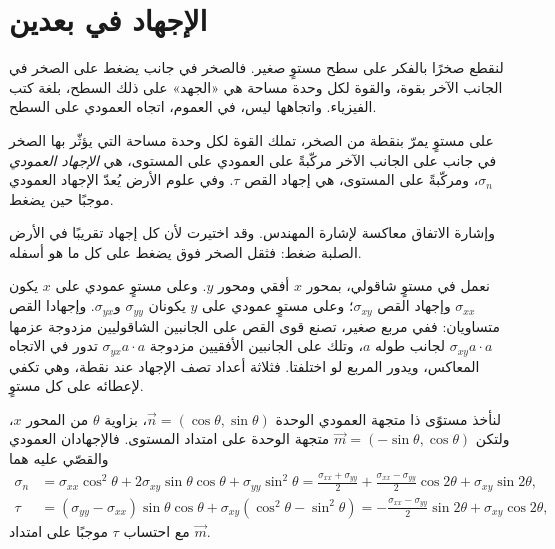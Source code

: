 \section{الإجهاد في بعدين}\label{sec:b1:stress-strain-rheology:stress}

لنقطع صخرًا بالفكر على سطح مستوٍ صغير. فالصخر في جانب يضغط على الصخر في الجانب الآخر بقوة، والقوة لكل وحدة مساحة هي «الجهد» على ذلك السطح، بلغة كتب الفيزياء. واتجاهها ليس، في العموم، اتجاه العمودي على السطح.

\begin{definition}\label{def:b1:stress-strain-rheology:stress}
على مستوٍ يمرّ بنقطة من الصخر، تملك القوة لكل وحدة مساحة التي يؤثّر بها الصخر في جانب على الجانب الآخر مركّبةً على العمودي على المستوى، هي \emph{الإجهاد العمودي} $\sigma_n$، ومركّبةً على المستوى، هي إجهاد القص $\tau$. وفي علوم الأرض يُعدّ الإجهاد العمودي موجبًا حين يضغط.
\end{definition}

وإشارة الاتفاق معاكسة لإشارة المهندس. وقد اختيرت لأن كل إجهاد تقريبًا في الأرض الصلبة ضغط: فثقل الصخر فوق يضغط على كل ما هو أسفله.

نعمل في مستوٍ شاقولي، بمحور $x$ أفقي ومحور $y$. وعلى مستوٍ عمودي على $x$ يكون  $\sigma_{xx}$ وإجهاد القص $\sigma_{xy}$؛ وعلى مستوٍ عمودي على $y$ يكونان $\sigma_{yy}$ و$\sigma_{yx}$. وإجهادا القص متساويان: ففي مربع صغير، تصنع قوى القص على الجانبين الشاقوليين مزدوجة عزمها $\sigma_{xy}a\cdot a$ لجانب طوله $a$، وتلك على الجانبين الأفقيين مزدوجة $\sigma_{yx}a\cdot a$ تدور في الاتجاه المعاكس، ويدور المربع لو اختلفتا. فثلاثة أعداد تصف الإجهاد عند نقطة، وهي تكفي لإعطائه على كل مستوٍ.

\begin{proposition}\label{prop:b1:stress-strain-rheology:transformation}
لنأخذ مستوًى ذا متجهة العمودي الوحدة $\vec n = (\cos\theta, \sin\theta)$، بزاوية $\theta$ من المحور $x$، ولتكن $\vec m = (-\sin\theta, \cos\theta)$ متجهة الوحدة على امتداد المستوى. فالإجهادان العمودي والقصّي عليه هما
\begin{align*}
  \sigma_n &= \sigma_{xx}\cos^2\theta + 2\sigma_{xy}\sin\theta\cos\theta + \sigma_{yy}\sin^2\theta
           = \frac{\sigma_{xx}+\sigma_{yy}}{2} + \frac{\sigma_{xx}-\sigma_{yy}}{2}\cos2\theta + \sigma_{xy}\sin2\theta, \\
  \tau     &= (\sigma_{yy}-\sigma_{xx})\sin\theta\cos\theta + \sigma_{xy}(\cos^2\theta - \sin^2\theta)
           = -\frac{\sigma_{xx}-\sigma_{yy}}{2}\sin2\theta + \sigma_{xy}\cos2\theta ,
\end{align*}
مع احتساب $\tau$ موجبًا على امتداد $\vec m$.
\end{proposition}

